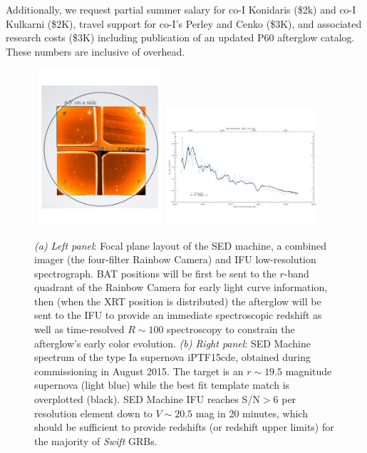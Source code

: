 \documentclass[letterpaper,11pt]{article}
\begin{document}
Additionally, we request partial summer salary for co-I Konidaris (\$2k) and
co-I Kulkarni (\$2K), travel support for co-I's Perley and Cenko
(\$3K), and associated research costs (\$3K) including publication of an
updated P60 afterglow catalog.  These numbers are inclusive of overhead. 

\begin{figure}[ht!]
\begin{center}
\hbox{
 \includegraphics[width=0.4\textwidth]{SEDM.pdf}
 \hspace{0.5cm}
 \includegraphics[width=0.5\textwidth]{15cde.pdf}
 }
\end{center}
\caption{\footnotesize
{{\it (a) Left panel}: Focal plane layout of the SED machine, a combined imager 
(the four-filter Rainbow Camera) and IFU low-resolution spectrograph.  BAT positions 
will be first be sent to the $r$-band quadrant of the Rainbow Camera for early 
light curve information, then (when the XRT position is distributed) the afterglow 
will be sent to the IFU to provide an immediate spectroscopic redshift as well as 
time-resolved $R\sim100$ spectroscopy to constrain the afterglow's early color 
evolution. {\it (b) Right panel}: SED Machine spectrum of the type Ia supernova
iPTF15cde, obtained during commissioning in August 2015. The target is an $r\sim19.5$ magnitude supernova (light blue) while the best fit template match is overplotted (black). SED Machine IFU
reaches S/N$>$6 per resolution element down to $V \sim 20.5$ mag in 20 minutes,
which should be sufficient to provide redshifts (or redshift upper limits) for
the majority of \textit{Swift} GRBs.}}
\label{fig2}
\end{figure}
\end{document}
